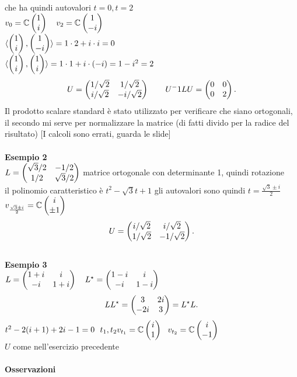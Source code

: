 \documentclass[12px]{article}
\begin{document}
	che ha quindi autovalori $t = 0, t = 2$\\
	$v_0 = \mathbb{C}\begin{pmatrix}1\\i\end{pmatrix}\ \ \ v_2 = \mathbb{C}\begin{pmatrix}1\\-i\end{pmatrix}$\\
	$\langle \begin{pmatrix}1\\i\end{pmatrix}, \begin{pmatrix}1\\-i\end{pmatrix} \rangle  = 1 \cdot 2 + i\cdot i = 0$\\
	$ \langle \begin{pmatrix}1\\i\end{pmatrix}, \begin{pmatrix}1\\i\end{pmatrix} \rangle = 1\cdot 1 + i\cdot(-i) = 1-i^2 = 2$
	\[
		U = \begin{pmatrix}1/\sqrt{2} &1/\sqrt{2}\\i/\sqrt{2}&-i/\sqrt{2}\end{pmatrix}\ \ \ \ \ \ U^-1LU = \begin{pmatrix}0&0\\0&2\end{pmatrix}
	.\] 
	Il prodotto scalare standard è stato utilizzato per verificare che siano ortogonali, il secondo mi serve per normalizzare la matrice (di fatti divido per la radice del risultato) [I calcoli sono errati, guarda le slide]\ \\ \hline\newpage \ \\ 
	\textbf{Esempio 2}\\
		$L = \begin{pmatrix}\sqrt{3}/2&-1/2\\1/2&\sqrt{3}/2\end{pmatrix}$ matrice ortogonale con determinante 1, quindi rotazione\\
		il polinomio caratteristico è $t^2 - \sqrt 3 t + 1$ gli autovalori sono quindi $t = \frac {\sqrt{3}\pm i}{2}$
		$v_{\frac {\sqrt{3}\pm i}{2}} = \mathbb{C}\begin{pmatrix}i\\\pm 1\end{pmatrix}$
		 \[
			 U = \begin{pmatrix}i/\sqrt 2 & i/\sqrt 2\\ 1/\sqrt 2 & - 1/\sqrt 2\end{pmatrix}
		.\] 
		\hline \ \\[10px]
		\textbf{Esempio 3}\\[8px]
			 $L = \matrice{1 +i&i\\-i&1+i} \ \ \ L^\star = \matrice{1-i&i\\-i&1-i}\\$
			 \[
				 LL^\star = \begin{pmatrix}3&2i\\-2i&3\end{pmatrix} = L^\star L
			 .\] 
			 $t^2 - 2(i + 1) + 2i - 1 = 0\ \ t_1,t_2\\
			 v_{t_1} = \mathbb{C}\begin{pmatrix}i\\1\end{pmatrix} \ \ v_{t_2} = \mathbb{C}\begin{pmatrix}i\\-1\end{pmatrix}$\\
			 $U$ come nell'esercizio precedente\\ \ \hline \ \\
	\textbf{Osservazioni}\\
\end{document}

